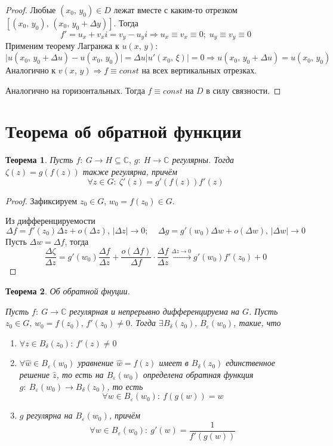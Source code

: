 \documentclass[a4paper,12pt]{article}
\theoremstyle{plain}
\newtheorem{theorem}{Теорема}[section]
\theoremstyle{definition}
\theoremstyle{remark}
\begin{document}
\begin{proof}
	Любые $(x_0,\, y_0) \in D$ лежат вместе с каким-то отрезком $[(x_0,\, y_0),\, (x_0,\, y_0 + \Delta y)]$. Тогда
	\[
		f' = u_x + v_xi = v_y - u_yi \Rightarrow u_x \equiv v_x \equiv 0;\; u_y \equiv v_y \equiv 0
	\]
	Применим теорему Лагранжа к $u(x,\,y)$:
	\[
		\vert u(x_0,\, y_0 + \Delta u) - u(x_0,\, y_0)\vert = \Delta u\vert u'(x_0,\, \xi)\vert = 0 \Rightarrow u(x_0,\, y_0 + \Delta u) = u(x_0,\, y_0)		
	\] 
	Аналогично к $v(x,\,y) \Rightarrow f \equiv const$ на всех вертикальных отрезках.

	Аналогично на горизонтальных. Тогда $f \equiv const$ на $D$ в силу связности.
\end{proof}

\section{Теорема об обратной функции}
\begin{theorem}
	Пусть $f :\: G \to H \subseteq \mathbb{C},\, g :\: H \to \mathbb{C}$ регулярны. Тогда $\zeta(z) = g(f(z))$ также регулярна, причём
	\[
		\forall z \in G :\: \zeta'(z) = g'(f(z))f'(z)
	\]
\end{theorem}

\begin{proof}
	Зафиксируем $z_0 \in G,\, w_0 = f(z_0) \in G$.

	Из дифференцируемости
	\[
		\Delta f = f'(z_0)\Delta z + o(\Delta z),\, \vert\Delta z\vert \to 0;\;\;\;\; \Delta g = g'(w_0)\Delta w + o(\Delta w),\, \vert\Delta w\vert \to 0
	\]
	Пусть $\Delta w = \Delta f$, тогда
	\[
		\frac{\Delta\zeta}{\Delta z} = g'(w_0)\frac{\Delta f}{\Delta z} + \frac{o(\Delta f)}{\Delta f}\cdot\frac{\Delta f}{\Delta z} \overset{\Delta z \to 0}{\to} g'(w_0)f'(z_0) + 0
	\]
\end{proof}

\begin{theorem}
	Об обратной фнуции.

	Пусть $f :\: G \to \mathbb{C}$ регулярная и непрерывно дифференцируема на $G$. Пусть $z_0 \in G,\, w_0 = f(z_0),\, f'(z_0) \neq 0$. Тогда $\exists B_\delta(z_0),\, B_\varepsilon(w_0)$, такие, что
	\begin{enumerate}
		\item $\forall z \in B_\delta(z_0) :\: f'(z) \neq 0$
		\item $\forall \hat{w} \in B_\varepsilon(w_0)$ уравнение $\hat{w} = f(z)$ имеет в $B_\delta(z_0)$ единственное решение $\hat{z}$, то есть на $B_\varepsilon(w_0)$ определена обратная функция $g :\: B_\varepsilon(w_0) \to B_\delta(z_0)$, то есть
		      \[
			      \forall w \in B_\varepsilon(w_0) :\: f(g(w)) = w
		      \]
		\item $g$ регулярна на $B_\varepsilon(w_0)$, причём
		      \[
			      \forall w \in B_\varepsilon(w_0) :\: g'(w) = \frac{1}{f'(g(w))}
		      \]
	\end{enumerate}
\end{theorem}
\end{document}

